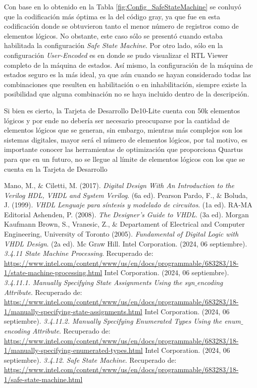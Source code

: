 \documentclass{article}
\begin{document}
Con base en lo obtenido en la Tabla \ref{fig:Config_SafeStateMachine} se conluyó que la codificación más óptima es la del código gray, ya que fue en esta codificación donde se obtuvieron tanto el menor número de registros como de elementos lógicos. No obstante, este caso sólo se presentó cuando estaba habilitada la configuración \textit{Safe State Machine}. Por otro lado, sólo en la configuración \textit{User-Encoded} es en donde se pudo visualizar el RTL Viewer completo de la máquina de estados. Así mismo, la configuración de la máquina de estados seguro es la más ideal, ya que aún cuando se hayan considerado todas las combinaciones que resulten en habilitación o en inhabilitación, siempre existe la posibilidad que alguna combinación no se haya incluido dentro de la descripción.

Si bien es cierto, la Tarjeta de Desarrollo De10-Lite cuenta con 50k elementos lógicos y por ende no debería ser necesario preocuparse por la cantidad de elementos lógicos que se generan, sin embargo, mientras más complejos son los sistemas digitales, mayor será el número de elementos lógicos, por tal motivo, es importante conocer las herramientas de optimización que proporciona Quartus para que en un futuro, no se llegue al límite de elementos lógicos con los que se cuenta en la Tarjeta de Desarrollo
 
\begin{thebibliography}{1}
 Mano, M., $\&$ Ciletti, M. (2017). \textit{Digital Design With An Introduction to the Verilog HDL, VHDL and System Verilog}. (6a ed). Pearson
 Pardo, F., $\&$ Boluda, J. (1999). \textit{VHDL Lenguaje para síntesis y modelado de circuitos}. (1a ed). RA-MA Editorial
 Ashenden, P. (2008). \textit{The Designer's Guide to VHDL}. (3a ed). Morgan Kaufmann
 Brown, S., Vranesic, Z., $\&$ Departament of Electrical and Computer Engineering, University of Toronto (2005). \textit{Fundamental of Digital Logic with VHDL Design}. (2a ed). Mc Graw Hill.
 Intel Corporation. (2024, 06 septiembre). \textit{3.4.11 State Machine Processing}. Recuperado de: \url{https://www.intel.com/content/www/us/en/docs/programmable/683283/18-1/state-machine-processing.html}
 Intel Corporation. (2024, 06 septiembre). \textit{3.4.11.1. Manually Specifying State Assignments Using the syn$\_$encoding Attribute}. Recuperado de: \url{https://www.intel.com/content/www/us/en/docs/programmable/683283/18-1/manually-specifying-state-assignments.html}
 Intel Corporation. (2024, 06 septiembre). \textit{3.4.11.2. Manually Specifying Enumerated Types Using the enum$\_$encoding Attribute}. Recuperado de: \url{https://www.intel.com/content/www/us/en/docs/programmable/683283/18-1/manually-specifying-enumerated-types.html}
 Intel Corporation. (2024, 06 septiembre). \textit{3.4.12. Safe State Machine}. Recuperado de: \url{https://www.intel.com/content/www/us/en/docs/programmable/683283/18-1/safe-state-machine.html}
\end{thebibliography}
\appendix
\end{document}
